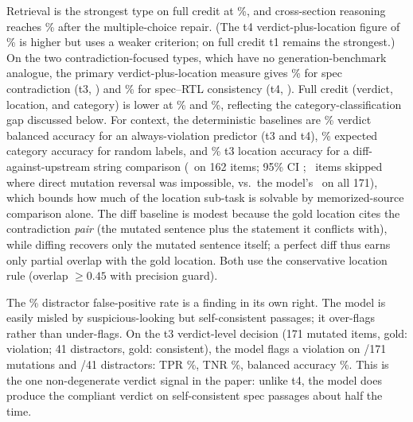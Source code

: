 \documentclass[11pt]{article}
\begin{document}
Retrieval is the strongest type on full credit at \ConsAccTone\%, and cross-section reasoning reaches \ConsAccTtwo\% after the multiple-choice repair. (The t4 verdict-plus-location figure of \ConsAccVLTfour\% is higher but uses a weaker criterion; on full credit t1 remains the strongest.) On the two contradiction-focused types, which have no generation-benchmark analogue, the primary verdict-plus-location measure gives \ConsAccVLTthree\% for spec contradiction (t3, \ConsVLTthree) and \ConsAccVLTfour\% for spec--RTL consistency (t4, \ConsVLTfour). Full credit (verdict, location, and category) is lower at \ConsAccTthree\% and \ConsAccTfour\%, reflecting the category-classification gap discussed below. For context, the deterministic baselines are \BaseAVtThree\% verdict balanced accuracy for an always-violation predictor (t3 and t4), \BaseRandCat\% expected category accuracy for random labels, and \BaseDiffAcc\% t3 location accuracy for a diff-against-upstream string comparison (\BaseDiffN\ on 162 items; 95\% CI \BaseDiffCI; \BaseDiffSkip\ items skipped where direct mutation reversal was impossible, vs.\ the model's \LayTthreeLoc\ on all 171), which bounds how much of the location sub-task is solvable by memorized-source comparison alone. The diff baseline is modest because the gold location cites the contradiction \emph{pair} (the mutated sentence plus the statement it conflicts with), while diffing recovers only the mutated sentence itself; a perfect diff thus earns only partial overlap with the gold location. Both use the conservative location rule (overlap $\ge 0.45$ with precision guard).

The \DistrAccFPR\% distractor false-positive rate is a finding in its own right. The model is easily misled by suspicious-looking but self-consistent passages; it over-flags rather than under-flags. On the t3 verdict-level decision (171 mutated items, gold: violation; 41 distractors, gold: consistent), the model flags a violation on \TthreeVerdTP/171 mutations and \TthreeVerdFP/41 distractors: TPR \TthreeVerdTPR\%, TNR \TthreeVerdTNR\%, balanced accuracy \TthreeVerdBalAcc\%. This is the one non-degenerate verdict signal in the paper: unlike t4, the model does produce the compliant verdict on self-consistent spec passages about half the time.
\end{document}
